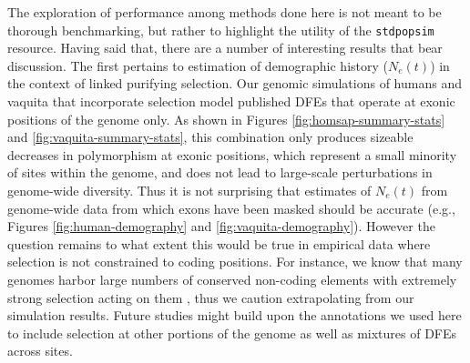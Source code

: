 \documentclass[hidelinks]{article}
\newcommand{\stdpopsim}{\texttt{stdpopsim}\xspace}
\begin{document}
    The exploration of performance among methods done here is not meant to be thorough 
    benchmarking, but rather to highlight the utility of the \stdpopsim resource. 
    Having said that, there are a number of interesting results that bear discussion. 
    The first pertains to estimation of demographic history ($N_e(t)$) in the context of
    linked purifying selection. Our genomic simulations of humans and vaquita that incorporate
    selection model published DFEs that operate at exonic positions of the genome only. 
    As shown in Figures \ref{fig:homsap-summary-stats} and \ref{fig:vaquita-summary-stats},
    this combination only produces sizeable decreases in polymorphism at exonic positions, 
    which represent a small minority of sites within the genome, and does not lead to large-scale
    perturbations in genome-wide diversity. Thus it is not surprising that estimates of $N_e(t)$
    from genome-wide data from which exons have been masked should be accurate 
    (e.g., Figures \ref{fig:human-demography} and \ref{fig:vaquita-demography}). 
    However the question remains to what extent this would be true in empirical data where
    selection is not constrained to coding positions. For instance, we know
    that many genomes harbor large numbers
    of conserved non-coding elements \citep[e.g.,][]{siepel2005evolutionarily} with extremely
    strong selection acting on them \citep{katzman2007human,mclean2008dispensability},
    thus we caution extrapolating from our simulation results. Future studies might build upon
    the annotations we used here to include selection at other portions of the genome as well
    as mixtures of DFEs across sites. 
\end{document}
